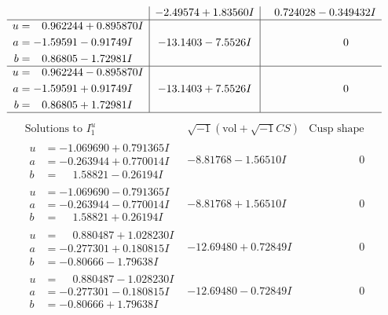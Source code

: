 \documentclass[1p]{elsarticle_modified}
\theoremstyle{definition}
\newcommand{\I}{\sqrt{-1}}
\begin{document}
$$\begin{array}{c|c|c}
 & -2.49574 + 1.83560 I & \phantom{-}0.724028 - 0.349432 I \\ \hline\begin{aligned}
u &= \phantom{-}0.962244 + 0.895870 I \\
a &= -1.59591 - 0.91749 I \\
b &= \phantom{-}0.86805 - 1.72981 I\end{aligned}
 & -13.1403 - 7.5526 I & \phantom{-0.000000 } 0 \\ \hline\begin{aligned}
u &= \phantom{-}0.962244 - 0.895870 I \\
a &= -1.59591 + 0.91749 I \\
b &= \phantom{-}0.86805 + 1.72981 I\end{aligned}
 & -13.1403 + 7.5526 I & \phantom{-0.000000 } 0\\
 \hline 
 \end{array}$$\newpage$$\begin{array}{c|c|c}  
\text{Solutions to }I^u_{1}& \I (\text{vol} + \sqrt{-1}CS) & \text{Cusp shape}\\
 \hline 
\begin{aligned}
u &= -1.069690 + 0.791365 I \\
a &= -0.263944 + 0.770014 I \\
b &= \phantom{-}1.58821 - 0.26194 I\end{aligned}
 & -8.81768 - 1.56510 I & \phantom{-0.000000 } 0 \\ \hline\begin{aligned}
u &= -1.069690 - 0.791365 I \\
a &= -0.263944 - 0.770014 I \\
b &= \phantom{-}1.58821 + 0.26194 I\end{aligned}
 & -8.81768 + 1.56510 I & \phantom{-0.000000 } 0 \\ \hline\begin{aligned}
u &= \phantom{-}0.880487 + 1.028230 I \\
a &= -0.277301 + 0.180815 I \\
b &= -0.80666 - 1.79638 I\end{aligned}
 & -12.69480 + 0.72849 I & \phantom{-0.000000 } 0 \\ \hline\begin{aligned}
u &= \phantom{-}0.880487 - 1.028230 I \\
a &= -0.277301 - 0.180815 I \\
b &= -0.80666 + 1.79638 I\end{aligned}
 & -12.69480 - 0.72849 I & \phantom{-0.000000 } 0 \\ \hline\begin{aligned}

\end{aligned}
\end{array}$$
\end{document}
